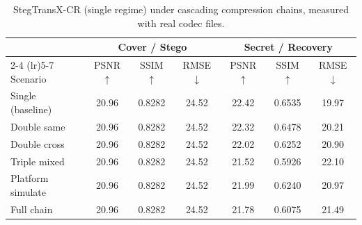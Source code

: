 \begin{table}[t]
\centering
\caption{StegTransX-CR (single regime) under cascading compression chains, measured with real codec files.}
\label{tab:single-cascade-real}
\begin{tabular}{lcccccc}
\toprule
& \multicolumn{3}{c}{Cover / Stego} & \multicolumn{3}{c}{Secret / Recovery} \\
\cmidrule(lr){2-4} \cmidrule(lr){5-7}
Scenario & PSNR $\uparrow$ & SSIM $\uparrow$ & RMSE $\downarrow$ & PSNR $\uparrow$ & SSIM $\uparrow$ & RMSE $\downarrow$ \\
\midrule
Single (baseline) & 20.96 & 0.8282 & 24.52 & 22.42 & 0.6535 & 19.97 \\
Double same & 20.96 & 0.8282 & 24.52 & 22.32 & 0.6478 & 20.21 \\
Double cross & 20.96 & 0.8282 & 24.52 & 22.02 & 0.6252 & 20.90 \\
Triple mixed & 20.96 & 0.8282 & 24.52 & 21.52 & 0.5926 & 22.10 \\
Platform simulate & 20.96 & 0.8282 & 24.52 & 21.99 & 0.6240 & 20.97 \\
Full chain & 20.96 & 0.8282 & 24.52 & 21.78 & 0.6075 & 21.49 \\
\bottomrule
\end{tabular}
\end{table}
